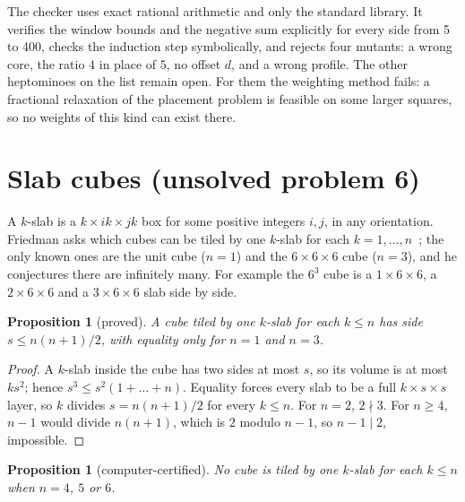\documentclass[11pt]{amsart}
\newtheorem{proposition}[theorem]{Proposition}
\theoremstyle{remark}
\begin{document}
The checker  uses exact rational arithmetic and only the
standard library. It verifies the window bounds and the negative sum explicitly for every side from 5
to 400, checks the induction step symbolically, and rejects four mutants: a wrong core, the ratio $4$
in place of $5$, no offset $d$, and a wrong profile. The other heptominoes on the list remain open.
For them the weighting method fails: a fractional relaxation of the placement problem is feasible on
some larger squares, so no weights of this kind can exist there.


\section{Slab cubes (unsolved problem 6)}\label{sec:slabs}

A $k$-slab is a $k\times ik\times jk$ box for some positive integers $i,j$, in any orientation. Friedman
asks which cubes can be tiled by one $k$-slab for each $k=1,\dots,n$~\cite{slabs}; the only known ones are
the unit cube ($n=1$) and the $6\times6\times6$ cube ($n=3$), and he conjectures there are infinitely
many. For example the $6^3$ cube is a $1\times6\times6$, a $2\times6\times6$ and a $3\times6\times6$
slab side by side.

\begin{proposition}[proved]
A cube tiled by one $k$-slab for each $k\le n$ has side $s\le n(n+1)/2$, with equality only for $n=1$
and $n=3$.
\end{proposition}

\begin{proof}
A $k$-slab inside the cube has two sides at most $s$, so its volume is at most $ks^2$; hence
$s^3\le s^2(1+\dots+n)$. Equality forces every slab to be a full $k\times s\times s$ layer, so $k$
divides $s=n(n+1)/2$ for every $k\le n$. For $n=2$, $2\nmid3$. For $n\ge4$, $n-1$ would divide
$n(n+1)$, which is $2$ modulo $n-1$, so $n-1\mid2$, impossible.
\end{proof}

\begin{proposition}[computer-certified]
No cube is tiled by one $k$-slab for each $k\le n$ when $n=4$, $5$ or $6$.
\end{proposition}
\end{document}
